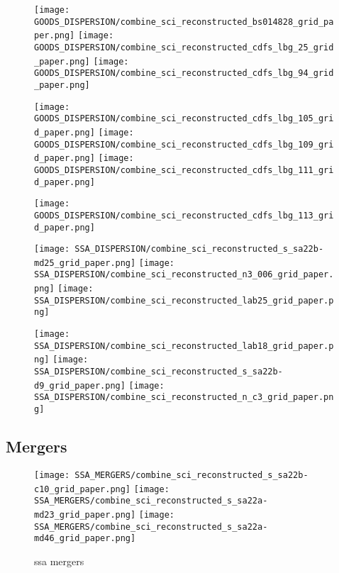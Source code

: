 \documentclass[fleqn,usenatbib]{mn2e}
\begin{document}
\begin{figure*}
\centering
\texttt{[image: GOODS\_DISPERSION/combine\_sci\_reconstructed\_bs014828\_grid\_paper.png]}
\texttt{[image: GOODS\_DISPERSION/combine\_sci\_reconstructed\_cdfs\_lbg\_25\_grid\_paper.png]}
\texttt{[image: GOODS\_DISPERSION/combine\_sci\_reconstructed\_cdfs\_lbg\_94\_grid\_paper.png]}
\label{fig:goods_disp_2}
\end{figure*}


\begin{figure*}
\centering
\texttt{[image: GOODS\_DISPERSION/combine\_sci\_reconstructed\_cdfs\_lbg\_105\_grid\_paper.png]}
\texttt{[image: GOODS\_DISPERSION/combine\_sci\_reconstructed\_cdfs\_lbg\_109\_grid\_paper.png]}
\texttt{[image: GOODS\_DISPERSION/combine\_sci\_reconstructed\_cdfs\_lbg\_111\_grid\_paper.png]}
\label{fig:goods_disp_3}
\end{figure*}

\begin{figure*}
\centering
\texttt{[image: GOODS\_DISPERSION/combine\_sci\_reconstructed\_cdfs\_lbg\_113\_grid\_paper.png]}
\label{fig:goods_disp_4}
\end{figure*}


\begin{figure*}
\centering
\texttt{[image: SSA\_DISPERSION/combine\_sci\_reconstructed\_s\_sa22b-md25\_grid\_paper.png]}
\texttt{[image: SSA\_DISPERSION/combine\_sci\_reconstructed\_n3\_006\_grid\_paper.png]}
\texttt{[image: SSA\_DISPERSION/combine\_sci\_reconstructed\_lab25\_grid\_paper.png]}
\label{fig:SSA_disp_2}
\end{figure*}


\begin{figure*}
\centering
\texttt{[image: SSA\_DISPERSION/combine\_sci\_reconstructed\_lab18\_grid\_paper.png]}
\texttt{[image: SSA\_DISPERSION/combine\_sci\_reconstructed\_s\_sa22b-d9\_grid\_paper.png]}
\texttt{[image: SSA\_DISPERSION/combine\_sci\_reconstructed\_n\_c3\_grid\_paper.png]}
\label{fig:SSA_disp_1}
\end{figure*}

\subsection{Mergers}\label{app:mergers}

\begin{figure*}
\centering
\texttt{[image: SSA\_MERGERS/combine\_sci\_reconstructed\_s\_sa22b-c10\_grid\_paper.png]}
\texttt{[image: SSA\_MERGERS/combine\_sci\_reconstructed\_s\_sa22a-md23\_grid\_paper.png]}
\texttt{[image: SSA\_MERGERS/combine\_sci\_reconstructed\_s\_sa22a-md46\_grid\_paper.png]}
\caption{ssa mergers}
\label{app:ssa_mergers_1}
\end{figure*}
\end{document}
